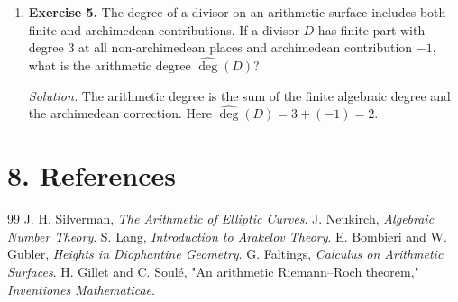 \begin{enumerate}[leftmargin=*,itemsep=0.9em]
\item \textbf{Exercise 5.} The degree of a divisor on an arithmetic surface includes both finite and archimedean contributions. If a divisor $D$ has finite part with degree $3$ at all non-archimedean places and archimedean contribution $-1$, what is the arithmetic degree $\widehat{\deg}(D)$?

\emph{Solution.} The arithmetic degree is the sum of the finite algebraic degree and the archimedean correction. Here $\widehat{\deg}(D)=3+(-1)=2$.

\end{enumerate}
\section*{8. References}
\begin{thebibliography}{99}
 J. H. Silverman, \emph{The Arithmetic of Elliptic Curves}.
 J. Neukirch, \emph{Algebraic Number Theory}.
 S. Lang, \emph{Introduction to Arakelov Theory}.
 E. Bombieri and W. Gubler, \emph{Heights in Diophantine Geometry}.
 G. Faltings, \emph{Calculus on Arithmetic Surfaces}.
 H. Gillet and C. Soulé, "An arithmetic Riemann--Roch theorem," \emph{Inventiones Mathematicae}.
\end{thebibliography}
